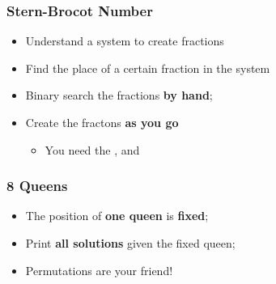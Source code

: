 \begin{frame}
  \frametitle{Stern-Brocot Number}

  {\small
    \begin{block}{}
      \begin{itemize}
      \item Understand a system to create fractions
      \item Find the place of a certain fraction in the system
      \end{itemize}
    \end{block}
    
    \begin{itemize}
    \item Binary search the fractions {\bf by hand};
    \item Create the fractons {\bf as you go}
      \begin{itemize}
      \item You need the ,  and 
      \end{itemize}
    \end{itemize}  
  }
\end{frame}

\begin{frame}
  \frametitle{8 Queens}

  {\small
    \begin{block}{}
      \begin{itemize}
      \item The position of {\bf one queen} is {\bf fixed};
      \item Print {\bf all solutions} given the fixed queen;
      \end{itemize}
    \end{block}

    \begin{itemize}
    \item Permutations are your friend!
    \end{itemize}
  }
\end{frame}

